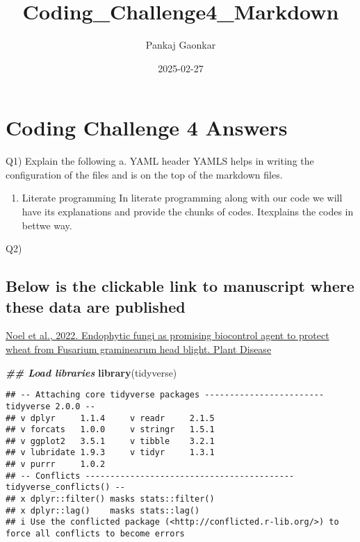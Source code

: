 \documentclass[
]{article}
\title{Coding\_Challenge4\_Markdown}
\author{Pankaj Gaonkar}
\date{2025-02-27}
\newenvironment{Shaded}{\begin{snugshade}}{\end{snugshade}}
\newcommand{\DocumentationTok}[1]{\textcolor[rgb]{0.56,0.35,0.01}{\textbf{\textit{#1}}}}
\newcommand{\FunctionTok}[1]{\textcolor[rgb]{0.13,0.29,0.53}{\textbf{#1}}}
\newcommand{\NormalTok}[1]{#1}
\providecommand{\tightlist}{%
  \setlength{\itemsep}{0pt}\setlength{\parskip}{0pt}}
\begin{document}
\maketitle

\section{Coding Challenge 4 Answers}\label{coding-challenge-4-answers}

Q1) Explain the following a. YAML header YAMLS helps in writing the
configuration of the files and is on the top of the markdown files.

\begin{enumerate}
\def\labelenumi{\alph{enumi}.}
\setcounter{enumi}{1}
\tightlist
\item
  Literate programming In literate programming along with our code we
  will have its explanations and provide the chunks of codes. Itexplains
  the codes in bettwe way.
\end{enumerate}

Q2)

\subsection{Below is the clickable link to manuscript where these data
are
published}\label{below-is-the-clickable-link-to-manuscript-where-these-data-are-published}

\href{https://doi.org/10.1094/PDIS-06-21-1253-RE}{Noel et al., 2022.
Endophytic fungi as promising biocontrol agent to protect wheat from
Fusarium graminearum head blight. Plant Disease}

\begin{Shaded}
\begin{Highlighting}[]
\DocumentationTok{\#\# Load libraries}
\FunctionTok{library}\NormalTok{(tidyverse)}
\end{Highlighting}
\end{Shaded}

\begin{verbatim}
## -- Attaching core tidyverse packages ------------------------ tidyverse 2.0.0 --
## v dplyr     1.1.4     v readr     2.1.5
## v forcats   1.0.0     v stringr   1.5.1
## v ggplot2   3.5.1     v tibble    3.2.1
## v lubridate 1.9.3     v tidyr     1.3.1
## v purrr     1.0.2     
## -- Conflicts ------------------------------------------ tidyverse_conflicts() --
## x dplyr::filter() masks stats::filter()
## x dplyr::lag()    masks stats::lag()
## i Use the conflicted package (<http://conflicted.r-lib.org/>) to force all conflicts to become errors
\end{verbatim}
\end{document}
